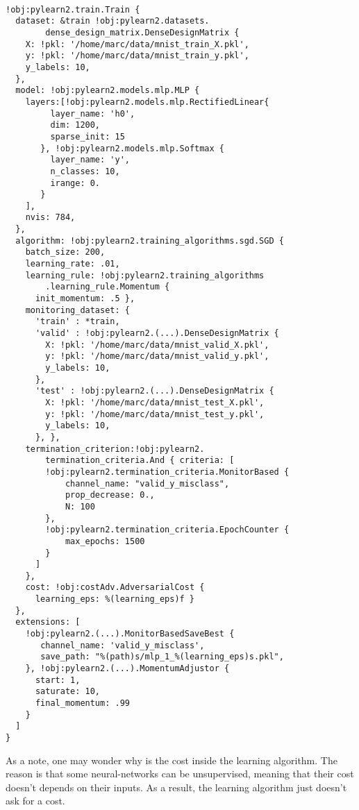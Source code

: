 		\lstset{language=Python}
		\begin{lstlisting}[basicstyle=\small,frame=single]

!obj:pylearn2.train.Train {
  dataset: &train !obj:pylearn2.datasets.
        dense_design_matrix.DenseDesignMatrix {
    X: !pkl: '/home/marc/data/mnist_train_X.pkl',
    y: !pkl: '/home/marc/data/mnist_train_y.pkl',
    y_labels: 10,
  },
  model: !obj:pylearn2.models.mlp.MLP {
    layers:[!obj:pylearn2.models.mlp.RectifiedLinear{
         layer_name: 'h0',
         dim: 1200,
         sparse_init: 15
       }, !obj:pylearn2.models.mlp.Softmax {
         layer_name: 'y',
         n_classes: 10,
         irange: 0.
       }
    ],
    nvis: 784,
  },
  algorithm: !obj:pylearn2.training_algorithms.sgd.SGD {
    batch_size: 200,
    learning_rate: .01,
    learning_rule: !obj:pylearn2.training_algorithms
        .learning_rule.Momentum {
      init_momentum: .5 },
    monitoring_dataset: {
      'train' : *train,
      'valid' : !obj:pylearn2.(...).DenseDesignMatrix {
        X: !pkl: '/home/marc/data/mnist_valid_X.pkl',
        y: !pkl: '/home/marc/data/mnist_valid_y.pkl',
        y_labels: 10,
      },
      'test' : !obj:pylearn2.(...).DenseDesignMatrix {
        X: !pkl: '/home/marc/data/mnist_test_X.pkl',
        y: !pkl: '/home/marc/data/mnist_test_y.pkl',
        y_labels: 10,
      }, },
    termination_criterion:!obj:pylearn2.
    	termination_criteria.And { criteria: [
        !obj:pylearn2.termination_criteria.MonitorBased {
            channel_name: "valid_y_misclass",
            prop_decrease: 0.,
            N: 100
        },
        !obj:pylearn2.termination_criteria.EpochCounter {
            max_epochs: 1500
        }
      ]
    },
    cost: !obj:costAdv.AdversarialCost {
      learning_eps: %(learning_eps)f }
  },
  extensions: [
    !obj:pylearn2.(...).MonitorBasedSaveBest {
       channel_name: 'valid_y_misclass',
       save_path: "%(path)s/mlp_1_%(learning_eps)s.pkl",
    }, !obj:pylearn2.(...).MomentumAdjustor {
      start: 1,
      saturate: 10,
      final_momentum: .99
    }
  ]
}
		\end{lstlisting}

		As a note, one may wonder why is the cost inside the learning algorithm. The reason is that some neural-networks can be unsupervised, meaning that their cost doesn't depends on their inputs. As a result, the learning algorithm just doesn't ask for a cost. 

